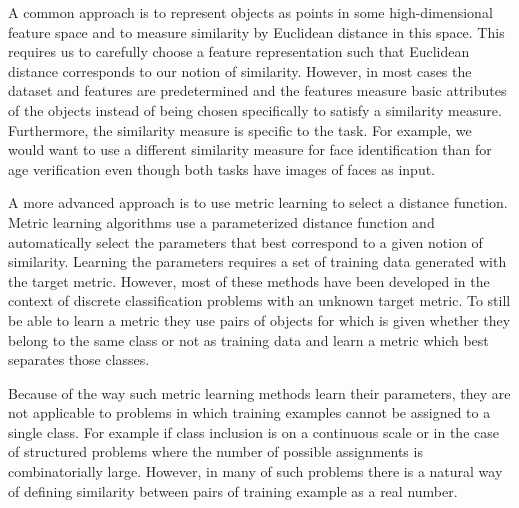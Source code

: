 \documentclass[a4paper,titlepage]{article}
\begin{document}
A common approach %
 is to represent objects as points in some high-dimensional feature space and to measure similarity by Euclidean distance in this space. This requires us to carefully choose a feature representation such that Euclidean distance corresponds to our notion of similarity.  However, in most cases the dataset and features are predetermined and the features  measure  basic attributes of the objects instead of being chosen specifically to satisfy a similarity measure. Furthermore, the similarity measure is specific to the task. For example, we would want to use a different similarity measure for face identification than for age verification even though both tasks have images of faces as input.

A more advanced approach is to use metric learning to select a distance function. Metric learning algorithms use a parameterized distance function and automatically select the parameters that best correspond to a given notion of similarity. Learning the parameters requires a set of training data generated with the target metric.  However, most of these methods have been developed in the context of discrete classification problems with an unknown target metric. To still be able to learn a metric they use pairs of objects for which is given whether they belong to the same class or not as training data and learn a metric which best separates those classes. 

Because of the way such metric learning methods learn their parameters, they are not applicable to problems in which training examples cannot be assigned to a single class. For example if class inclusion is on a continuous scale or in the case of structured problems where the number of possible assignments is combinatorially large. However, in many of such problems there is a natural way of defining similarity between pairs of training example as a real number. 
\end{document}
